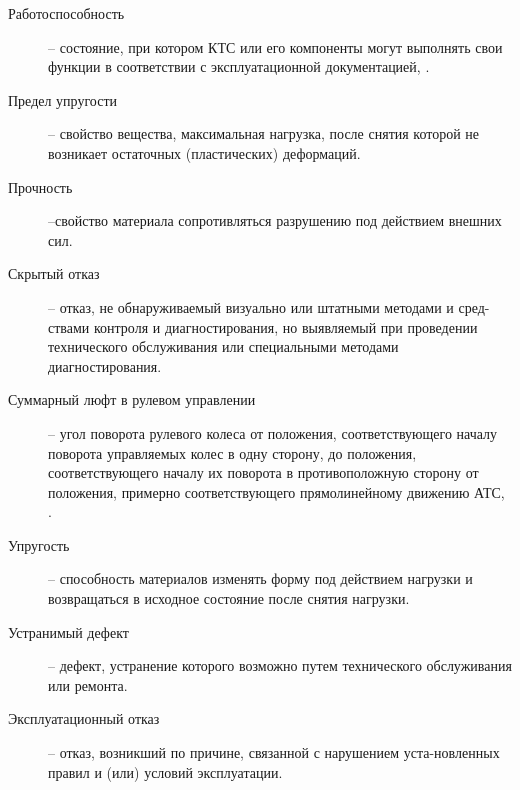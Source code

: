 \begin{description}
\item
[Работоспособность] -- состояние, при котором КТС или его компоненты могут выполнять свои функции в соответствии с эксплуатационной документацией, \cite[п.2.49]{33997:gost}.
	\item
	[Предел упругости ] -- свойство вещества, максимальная нагрузка, после снятия которой не возникает остаточных (пластических) деформаций.
	\item
	[Прочность] --свойство материала сопротивляться разрушению под действием внешних сил.
	\item
	[Скрытый отказ] -- отказ, не обнаруживаемый визуально или штатными методами и сред-ствами контроля и диагностирования, но выявляемый при проведении технического обслуживания или специальными методами диагностирования.
	\item[Суммарный люфт в рулевом управлении] -- угол поворота рулевого колеса от положения, соответствующего началу поворота управляемых колес в одну сторону, до положения, соответствующего началу их поворота в противоположную сторону от положения, примерно соответствующего прямолинейному движению АТС, \cite[п.2.66 ]{33997:gost}.
	\item
	[Упругость] --  способность  материалов  изменять форму  под  действием  нагрузки  и  возвращаться  в исходное состояние после снятия нагрузки.
	\item
	[Устранимый дефект] -- дефект, устранение которого возможно путем технического
	обслуживания или ремонта.
	
	
	\item
	[Эксплуатационный отказ] -- отказ, возникший по причине, связанной с нарушением уста-новленных правил и (или) условий эксплуатации.
	

\end{description}
